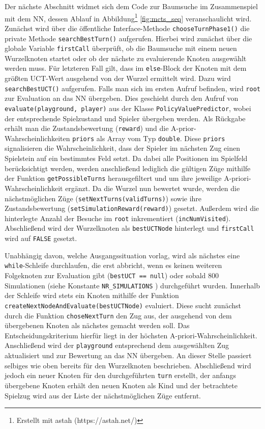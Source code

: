 \documentclass[12pt,a4paper]{article}
\begin{document}
Der nächste Abschnitt widmet sich dem Code zur Baumsuche im Zusammenspiel mit dem NN, dessen Ablauf in Abbildung\footnote{Erstellt mit astah (https://astah.net/)} \ref{fig:mcts_seq} veranschaulicht wird. Zunächst wird über die öffentliche Interface-Methode \texttt{chooseTurnPhase1()} die private Methode \texttt{searchBestTurn()} aufgerufen. Hierbei wird zunächst über die globale Variable \texttt{firstCall} überprüft, ob die Baumsuche mit einem neuen Wurzelknoten startet oder ob der nächste zu evaluierende Knoten ausgewählt werden muss. Für letzteren Fall gilt, dass im \texttt{else}-Block der Knoten mit dem größten UCT-Wert ausgehend von der Wurzel ermittelt wird. Dazu wird \texttt{searchBestUCT()} aufgerufen. Falls man sich im ersten Aufruf befinden, wird \texttt{root} zur Evaluation an das NN übergeben. Dies geschieht durch den Aufruf von \texttt{evaluate(playground, player)} aus der Klasse \texttt{PolicyValuePredictor}, wobei der entsprechende Spielzustand und Spieler übergeben werden. Als Rückgabe erhält man die Zustandsbewertung (\texttt{reward}) und die A-prior-Wahrscheinlichkeiten \texttt{priors} als Array vom Typ \texttt{double}. Diese \texttt{priors} signalisieren die Wahrscheinlichkeit, dass der Spieler im nächsten Zug einen Spielstein auf ein bestimmtes Feld setzt. Da dabei alle Positionen im Spielfeld berücksichtigt werden, werden anschließend lediglich die gültigen Züge mithilfe der Funktion \texttt{getPossibleTurns} herausgefiltert und um ihre jeweilige A-priori-Wahrscheinlichkeit ergänzt. Da die Wurzel nun bewertet wurde, werden die nächstmöglichen Züge (\texttt{setNextTurns(validTurns)}) sowie ihre Zustandsbewertung (\texttt{setSimulationReward(reward)}) gesetzt. Außerdem wird die hinterlegte Anzahl der Besuche im \texttt{root} inkrementiert (\texttt{incNumVisited}). Abschließend wird der Wurzelknoten als \texttt{bestUCTNode} hinterlegt und \texttt{firstCall} wird auf \texttt{FALSE} gesetzt. 

Unabhängig davon, welche Ausgangssituation vorlag, wird als nächstes eine \texttt{while}-Schleife durchlaufen, die erst abbricht, wenn es keinen weiteren Folgeknoten zur Evaluation gibt (\texttt{bestUCT == null}) oder sobald 800 Simulationen (siehe Konstante \texttt{NR\_SIMULATIONS} ) durchgeführt wurden. Innerhalb der Schleife wird stets ein Knoten mithilfe der Funktion \texttt{createNextNodeAndEvaluate(bestUCTNode)} evaluiert. Diese sucht zunächst durch die Funktion \texttt{choseNextTurn} den Zug aus, der ausgehend von dem übergebenen Knoten als nächstes gemacht werden soll. Das Entscheidungskriterium hierfür liegt in der höchsten A-priori-Wahrscheinlichkeit. Anschließend wird der \texttt{playground} entsprechend dem ausgewählten Zug aktualisiert und zur Bewertung an das NN übergeben. An dieser Stelle passiert selbiges wie oben bereits für den Wurzelknoten beschrieben. Abschließend wird jedoch ein neuer Knoten für den durchgeführten \texttt{turn} erstellt, der anfangs übergebene Knoten erhält den neuen Knoten als Kind und der betrachtete Spielzug wird aus der Liste der nächstmöglichen Züge entfernt.
\end{document}
